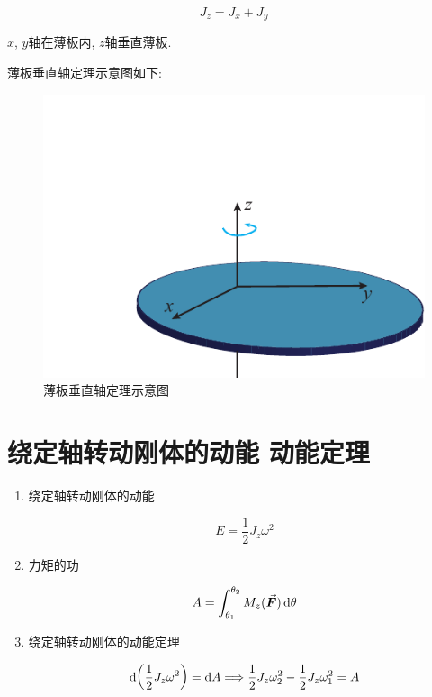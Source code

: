 \begin{theorem}[(薄板)垂直轴定理] \label{C5-th2}
	
	\begin{equation}
		J_z = J_x + J_y \label{C5-eq12}
	\end{equation}
	
	$x$, $y$轴在薄板内, $z$轴垂直薄板. 
	
\end{theorem}

薄板垂直轴定理示意图如下: 

\begin{figure}[htbp]
	\centering
	\includegraphics[scale=1.2]{C5-fig1.pdf}
	\caption{薄板垂直轴定理示意图}
	\label{C5-fig1}
\end{figure}

\section{绕定轴转动刚体的动能 \quad 动能定理} \label{5.3}

\begin{enumerate}
	
	\item 绕定轴转动刚体的动能
	
	\begin{equation}
		E = \dfrac{1}{2} J_z \omega^2 \label{C5-eq13}
	\end{equation}
	
	\item 力矩的功
	
	\begin{equation}
		A = \int_{\theta_1}^{\theta_2} M_z(\va*{F}) \dd{\theta} \label{C5-eq14}
	\end{equation}
	
	\item 绕定轴转动刚体的动能定理
	
	\begin{equation}
		\dd{\qty(\dfrac{1}{2} J_z \omega^2)} = \dd{A} \Longrightarrow \dfrac{1}{2} J_z \omega_2^2 - \dfrac{1}{2} J_z \omega_1^2 = A \label{C5-eq15}
	\end{equation}
	
\end{enumerate}

